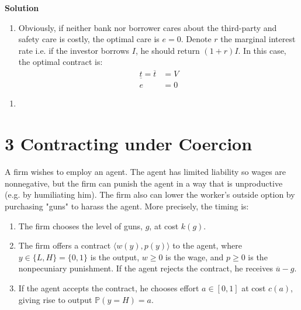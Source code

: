 \documentclass[a4paper]{article}
\newcommand{\prob}{\mathbb{P}}
\newcommand{\ubar}{\overline}
\newcommand{\lbar}{\underline}
\begin{document}
\textbf{Solution}


\begin{enumerate}
	\item Obviously, if neither bank nor borrower cares about the third-party and safety care is costly, the optimal care is $e = 0$. Denote $r$ the marginal interest rate i.e. if the investor borrows $I$, he should return $(1+r)I$. In this case, the optimal contract is:
	\begin{align*}
	\lbar{t} = \ubar{t} &= V\\
	e &= 0
	\end{align*}
\end{enumerate}
\begin{enumerate}
	\item 
\end{enumerate}
\section*{3 Contracting under Coercion}
	A firm wishes to employ an agent. The agent has limited liability so wages are
	nonnegative, but the firm can punish the agent in a way that is unproductive (e.g. by
	humiliating him). The firm also can lower the worker's outside option by purchasing
	"guns" to harass the agent. More precisely, the timing is:
	\begin{enumerate}
	\item The firm chooses the level of guns, $g$, at cost $k(g)$.
	\item The firm offers a contract $\langle w(y), p(y)\rangle$ to the agent, where $y \in \{L, H\} = \{0, 1\}$ is the output, $w \ge 0$ is the wage, and $p \ge 0$ is the nonpecuniary punishment. If the
	agent rejects the contract, he receives $\ubar{u}-g$.
	\item If the agent accepts the contract, he chooses effort $a \in [0, 1]$ at cost $c(a)$, giving rise
	to output $\prob (y = H) = a$.
	\end{enumerate}
\end{document}
